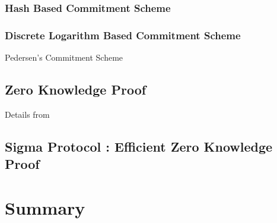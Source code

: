         \subsubsection{Hash Based Commitment Scheme}
        \subsubsection{Discrete Logarithm Based Commitment Scheme}
         Pedersen's Commitment Scheme
     \subsection{Zero Knowledge Proof}
  		Details from 
  	 \subsection{Sigma Protocol : Efficient Zero Knowledge Proof}
  



\section{Summary}










